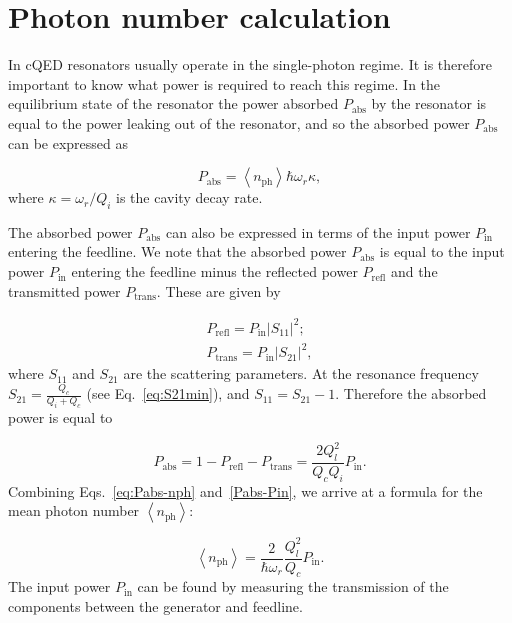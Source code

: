 




\chapter{Photon number calculation}
  \label{ch:photon number calculation}

  In cQED resonators usually operate in the single-photon regime. It is therefore important to know what power is required to reach this regime. In the equilibrium state of the resonator the power absorbed $P_\text{abs}$ by the resonator is equal to the power leaking out of the resonator, and so the absorbed power $P_\text{abs}$ can be expressed as

  \begin{equation}
    P_\text{abs} = \left<n_\text{ph}\right>\hbar\omega_r \kappa,
    \label{eq:Pabs-nph}
  \end{equation}
  where $\kappa=\omega_r/Q_i$ is the cavity decay rate.

  The absorbed power $P_\text{abs}$ can also be expressed in terms of the input power $P_\text{in}$ entering the feedline. We note that the absorbed power $P_\text{abs}$ is equal to the input power $P_\text{in}$ entering the feedline minus the reflected power $P_\text{refl}$ and the transmitted power $P_\text{trans}$. These are given by

  \begin{align}
    P_\text{refl} = P_\text{in}\left|S_{11}\right|^2;\\
    P_\text{trans} = P_\text{in}\left|S_{21}\right|^2,
  \end{align}
  where $S_{11}$ and $S_{21}$ are the scattering parameters. At the resonance frequency $S_{21}=\frac{Q_c}{Q_i+Q_c}$ (see Eq.~\ref{eq:S21min}), and $S_{11}=S_{21}-1$. Therefore the absorbed power is equal to

  \begin{equation}
    P_\text{abs}=1-P_\text{refl}-P_\text{trans}=\frac{2Q_l^2}{Q_c Q_i}P_\text{in}.
    \label{Pabs-Pin}
  \end{equation}
  Combining Eqs.~\ref{eq:Pabs-nph} and~\ref{Pabs-Pin}, we arrive at a formula for the mean photon number $\left<n_\text{ph}\right>$:

  \begin{equation}
    \left<n_\text{ph}\right> = \frac{2}{\hbar \omega_r}\frac{Q_l^2}{Q_c}P_\text{in}.
  \end{equation}
  The input power $P_\text{in}$ can be found by measuring the transmission of the components between the generator and feedline.



